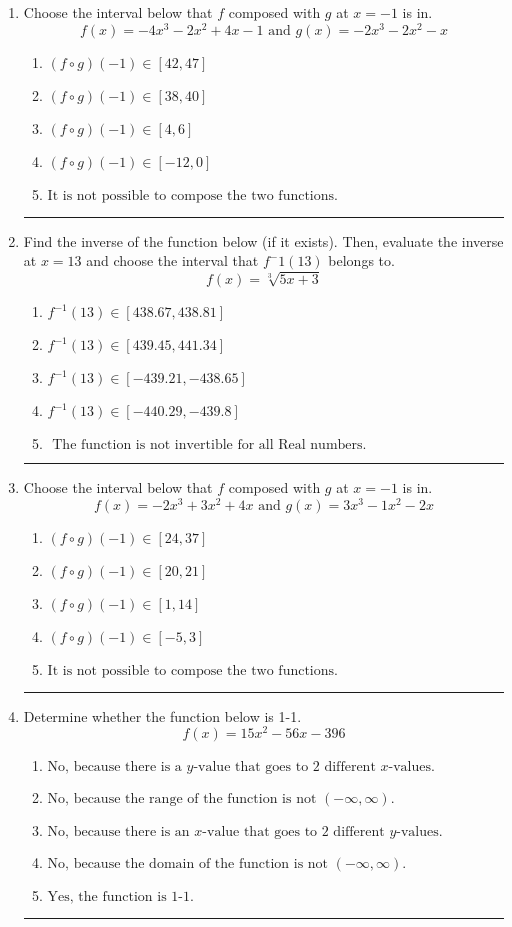 \documentclass[14pt]{extbook}
\newcommand{\litem}[1]{\item#1\hspace*{-1cm}\rule{\textwidth}{0.4pt}}
\begin{document}
\begin{enumerate}
{\begin{enumerate}[label=\Alph*.]
\end{enumerate} }
\litem{
Choose the interval below that $f$ composed with $g$ at $x=-1$ is in.\[ f(x) = -4x^{3} -2 x^{2} +4 x -1 \text{ and } g(x) = -2x^{3} -2 x^{2} -x \]\begin{enumerate}[label=\Alph*.]
\item \( (f \circ g)(-1) \in [42, 47] \)
\item \( (f \circ g)(-1) \in [38, 40] \)
\item \( (f \circ g)(-1) \in [4, 6] \)
\item \( (f \circ g)(-1) \in [-12, 0] \)
\item \( \text{It is not possible to compose the two functions.} \)

\end{enumerate} }
\litem{
Find the inverse of the function below (if it exists). Then, evaluate the inverse at $x = 13$ and choose the interval that $f^-1(13)$ belongs to.\[ f(x) = \sqrt[3]{5 x + 3} \]\begin{enumerate}[label=\Alph*.]
\item \( f^{-1}(13) \in [438.67, 438.81] \)
\item \( f^{-1}(13) \in [439.45, 441.34] \)
\item \( f^{-1}(13) \in [-439.21, -438.65] \)
\item \( f^{-1}(13) \in [-440.29, -439.8] \)
\item \( \text{ The function is not invertible for all Real numbers. } \)

\end{enumerate} }
\litem{
Choose the interval below that $f$ composed with $g$ at $x=-1$ is in.\[ f(x) = -2x^{3} +3 x^{2} +4 x \text{ and } g(x) = 3x^{3} -1 x^{2} -2 x \]\begin{enumerate}[label=\Alph*.]
\item \( (f \circ g)(-1) \in [24, 37] \)
\item \( (f \circ g)(-1) \in [20, 21] \)
\item \( (f \circ g)(-1) \in [1, 14] \)
\item \( (f \circ g)(-1) \in [-5, 3] \)
\item \( \text{It is not possible to compose the two functions.} \)

\end{enumerate} }
\litem{
Determine whether the function below is 1-1.\[ f(x) = 15 x^2 - 56 x - 396 \]\begin{enumerate}[label=\Alph*.]
\item \( \text{No, because there is a $y$-value that goes to 2 different $x$-values.} \)
\item \( \text{No, because the range of the function is not $(-\infty, \infty)$.} \)
\item \( \text{No, because there is an $x$-value that goes to 2 different $y$-values.} \)
\item \( \text{No, because the domain of the function is not $(-\infty, \infty)$.} \)
\item \( \text{Yes, the function is 1-1.} \)

\end{enumerate} }
\end{enumerate}
\end{document}

